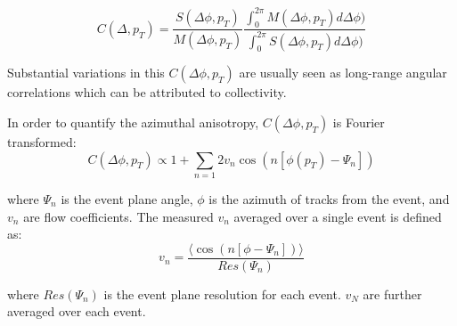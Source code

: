 \begin{equation}\label{eqn:corr_func}
  C(\Delta,p_T) = \frac{S(\Delta\phi,p_T)}{M(\Delta\phi,p_T)}\frac{\int_{0}^{2\pi}M(\Delta\phi,p_T)d\Delta\phi)}{\int_0^{2\pi}S(\Delta\phi,p_T)d\Delta\phi)}
\end{equation}

Substantial variations in this $C(\Delta\phi,p_T)$ are usually seen as long-range angular correlations which can be attributed to collectivity.

In order to quantify the azimuthal anisotropy, $C(\Delta\phi,p_T)$ is Fourier transformed:
\begin{equation}\label{eqn:dndphi}
  C(\Delta\phi,p_T) \propto 1 + \sum_{n=1}2 v_{n}\cos(n[\phi(p_T)-\Psi_n]) 
\end{equation}

where $\Psi_n$ is the event plane angle, $\phi$ is the azimuth of tracks from the event, and $v_n$ are flow coefficients. The measured $v_n$ averaged over a single event is defined as:
\begin{equation}\label{eqn:vn}
  v_n = \frac{\langle\cos(n[\phi-\Psi_n])\rangle}{Res(\Psi_n)}
\end{equation}

where $Res(\Psi_n)$ is the event plane resolution for each event. $v_N$ are further averaged over each event.\\

\fi




